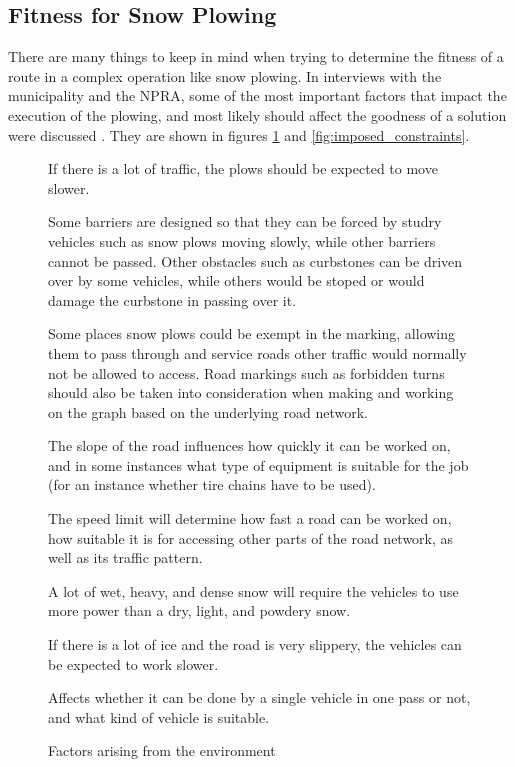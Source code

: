
\subsection{Fitness for Snow Plowing} %
\label{sub:fitness_for_snow_plowing}

There are many things to keep in mind when trying to determine the fitness of a route in a complex operation like snow plowing. In interviews with the municipality and the NPRA, some of the most important factors that impact the execution of the plowing, and most likely should affect the goodness of a solution were discussed \citep{meetingBigOneInTheFall}. They are shown in figures \ref{fig:environmental_factors} and \ref{fig:imposed_constraints}.


\begin{figure}[thbp]
\caption{Factors arising from the environment}
\label{fig:environmental_factors}
\begin{description}
	\item [Amount of traffic.] If there is a lot of traffic, the plows should be expected to move slower.
	\item [Obstacles such as barriers and curbstones.] Some barriers are designed so that they can be forced by studry vehicles such as snow plows moving slowly, while other barriers cannot be passed. Other obstacles such as curbstones can be driven over by some vehicles, while others would be stoped or would damage the curbstone in passing over it.
	\item [Road marking and regulation.] Some places snow plows could be exempt in the marking, allowing them to pass through and service roads other traffic would normally not be allowed to access. Road markings such as forbidden turns should also be taken into consideration when making and working on the graph based on the underlying road network.
	\item [Slope of the road.] The slope of the road influences how quickly it can be worked on, and in some instances what type of equipment is suitable for the job (for an instance whether tire chains have to be used).
	\item [Speed limit.] The speed limit will determine how fast a road can be worked on, how suitable it is for accessing other parts of the road network, as well as its traffic pattern.
	\item [Weather -- Quality of the snow.] A lot of wet, heavy, and dense snow will require the vehicles to use more power than a dry, light, and powdery snow.
	\item [Weather -- Slipperiness of the road.] If there is a lot of ice and the road is very slippery, the vehicles can be expected to work slower.
	\item [Width of the road.] Affects whether it can be done by a single vehicle in one pass or not, and what kind of vehicle is suitable.
\end{description}
\end{figure}

